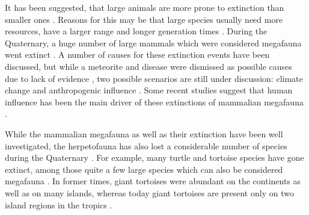 It has been suggested, that large animals are more prone to extinction than smaller ones \citep{.}. Reasons for this may be that large species usually need more resources, have a larger range and longer generation times \citep{.}. 
During the Quaternary, a huge number of large mammals which were considered megafauna went extinct \citep{.}.
A number of causes for these extinction events have been discussed, but while a meteorite and disease were dismissed as possible causes due to lack of evidence \citep{.}, two possible scenarios are still under discussion: climate change and anthropogenic influence \citep{.}.
Some recent studies suggest that human influence has been the main driver of these extinctions of mammalian megafauna \citep{Barnosky2004,Sandom2014,Gibbons2004,Schuster2000}.


While the mammalian megafauna as well as their extinction %
have been well investigated, the herpetofauna has also lost a considerable number of species during the Quaternary \citep{Blain2016}. 
For example, many turtle and tortoise species have gone extinct, among those quite a few large species which can also be considered megafauna \citep{Rhodin2015,Froyd2014,Pedrono2013}.
In former times, giant tortoises were abundant on the continents as well as on many islands, whereas today giant tortoises are present only on two island regions in the tropics \citep{.}
.




